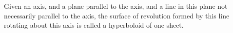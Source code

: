  Given an axis, and a plane parallel to the axis, and a line in this plane 
not necessarily parallel to the axis, the surface of revolution formed
by this line rotating about this axis is called a hyperboloid of 
one sheet.
